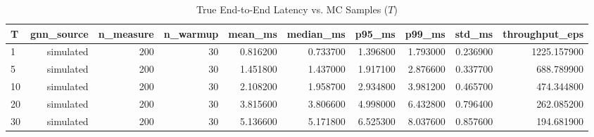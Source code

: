 \begin{table}[t]
\centering
\caption{True End-to-End Latency vs. MC Samples ($T$)}
\label{tab:e2e_latency}
\small
\begin{tabular}{lrrrrrrrrr}
\toprule
T & gnn_source & n_measure & n_warmup & mean_ms & median_ms & p95_ms & p99_ms & std_ms & throughput_eps \\
\midrule
1 & simulated & 200 & 30 & 0.816200 & 0.733700 & 1.396800 & 1.793000 & 0.236900 & 1225.157900 \\
5 & simulated & 200 & 30 & 1.451800 & 1.437000 & 1.917100 & 2.876600 & 0.337700 & 688.789900 \\
10 & simulated & 200 & 30 & 2.108200 & 1.958700 & 2.934800 & 3.981200 & 0.465700 & 474.344800 \\
20 & simulated & 200 & 30 & 3.815600 & 3.806600 & 4.998000 & 6.432800 & 0.796400 & 262.085200 \\
30 & simulated & 200 & 30 & 5.136600 & 5.171800 & 6.525300 & 8.037600 & 0.857600 & 194.681900 \\
\bottomrule
\end{tabular}
\end{table}
